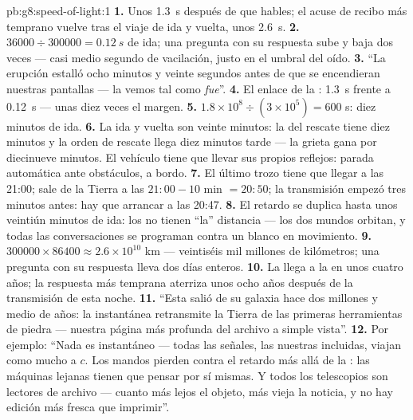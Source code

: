 \begin{solution}{pb:g8:speed-of-light:1}
\textbf{1.} Unos \qty{1.3}{s} después de que hables; el acuse de recibo
más temprano vuelve tras el viaje de ida y vuelta, unos \qty{2.6}{s}.
\textbf{2.} $36000 \div 300000 = \qty{0.12}{s}$ de ida; una pregunta
con su respuesta sube y baja dos veces --- casi medio segundo de
vacilación, justo en el umbral del oído.
\textbf{3.} ``La erupción estalló ocho minutos y veinte segundos antes
de que se encendieran nuestras pantallas --- la vemos tal como
\emph{fue}''.
\textbf{4.} El enlace de la : \qty{1.3}{s} frente a
\qty{0.12}{s} --- unas diez veces el margen.
\textbf{5.} $1.8 \times 10^{8} \div (3 \times 10^{5}) = 600$ s: diez
minutos de ida.
\textbf{6.} La ida y vuelta son veinte minutos: la  del rescate
tiene diez minutos y la orden de rescate llega diez minutos tarde ---
la grieta gana por diecinueve minutos. El vehículo tiene que llevar sus
propios reflejos: parada automática ante obstáculos, a bordo.
\textbf{7.} El último trozo tiene que llegar a las 21:00; sale de la
Tierra a las $21{:}00 - 10$ min $= 20{:}50$; la transmisión empezó tres
minutos antes: hay que arrancar a las 20:47.
\textbf{8.} El retardo se duplica hasta unos veintiún minutos de ida:
los  no tienen ``la'' distancia --- los dos mundos
orbitan, y todas las conversaciones se programan contra un blanco
en movimiento.
\textbf{9.} $300000 \times 86400 \approx 2.6 \times 10^{10}$ km ---
veintiséis mil millones de kilómetros; una pregunta con su respuesta
lleva dos días enteros.
\textbf{10.} La  llega a la  en unos cuatro
años; la respuesta más temprana aterriza unos ocho años después de la
transmisión de esta noche.
\textbf{11.} ``Esta  salió de su galaxia hace dos millones y
medio de años: la instantánea retransmite la Tierra de las primeras
herramientas de piedra --- nuestra página más profunda del archivo a
simple vista''.
\textbf{12.} Por ejemplo: ``Nada es instantáneo --- todas las señales,
las nuestras incluidas, viajan como mucho a $c$. Los mandos pierden
contra el retardo más allá de la : las máquinas lejanas tienen
que pensar por sí mismas. Y todos los telescopios son lectores de
archivo --- cuanto más lejos el objeto, más vieja la noticia, y no hay
edición más fresca que imprimir''.
\end{solution}
